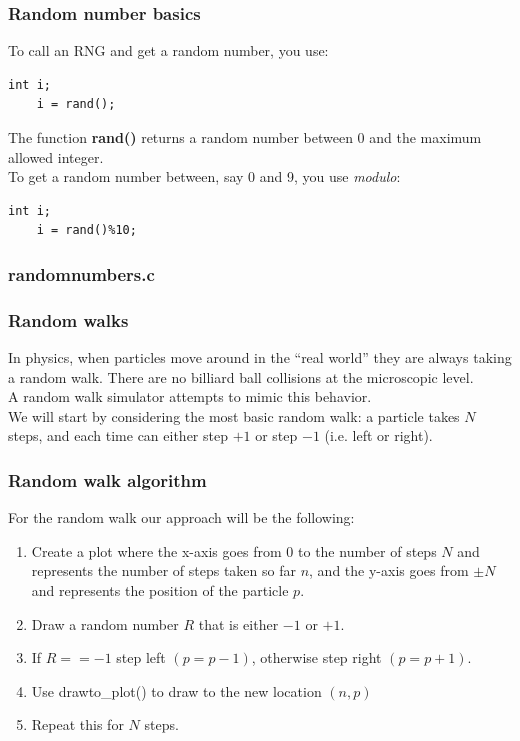 \documentclass{beamer}
\begin{document}
\begin{frame}[fragile]
  \frametitle{Random number basics}
  To call an RNG and get a random number, you use:
  \begin{lstlisting}[style=customc]
    int i;
    i = rand();
  \end{lstlisting}
  The function \textbf{rand()} returns a random number between 0 and
  the maximum allowed integer.\\
  To get a random number between, say 0 and 9, you use \textit{modulo}:
  \begin{lstlisting}[style=customc]
    int i;
    i = rand()%10;
  \end{lstlisting}
\end{frame}

\begin{frame}
  \frametitle{randomnumbers.c}
  
\end{frame}

\begin{frame}
  \frametitle{Random walks}
  In physics, when particles move around in the ``real world''
  they are always taking a random walk. There are no billiard ball
  collisions at the microscopic level.\\
  A random walk simulator attempts to mimic this behavior.\\
  \vspace{12pt}
  We will start by considering the most basic random walk: 
  a particle takes $N$ steps, and each time can either step $+1$
  or step $-1$ (i.e. left or right).
\end{frame}

\begin{frame}
  \frametitle{Random walk algorithm}
  For the random walk our 
  approach will be the following:
  \begin{enumerate}
  \item Create a plot where the x-axis goes from 0 to the number of steps $N$ 
    and represents the number of steps taken so far $n$,
    and the y-axis goes from $\pm N$ and represents the 
    position of the particle $p$.
  \item Draw a random number $R$ that is either $-1$ or $+1$.
  \item If $R==-1$ step left $(p=p-1)$, otherwise step right $(p=p+1)$.
  \item Use drawto\_plot() to draw to the new location $(n,p)$
  \item Repeat this for $N$ steps.
  \end{enumerate}
\end{frame}
\end{document}
